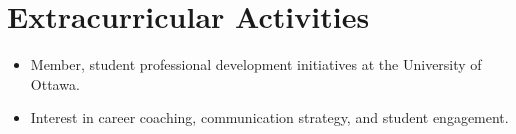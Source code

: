 \documentclass[a4paper,9pt]{article} %
\begin{document}
\section{Extracurricular Activities}
\begin{itemize}[leftmargin=0.15in, label={}]
    \item Member, student professional development initiatives at the University of Ottawa.
    \item Interest in career coaching, communication strategy, and student engagement.
\end{itemize}
\end{document}
